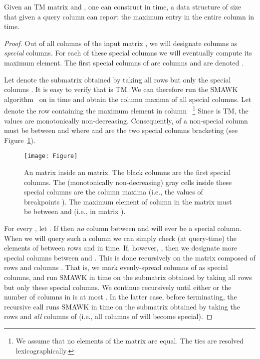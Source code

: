 \documentclass{llncs}
\begin{document}
\begin{lemma} \label{lemma:micro}
Given an  TM matrix and , one can construct in  time, a data structure of size  that given a query column can report the maximum entry in the entire column in 
 time. 
\end{lemma}
\begin{proof}
Out of all  columns of the input matrix , we will designate
 columns as {\em special} columns. For each of these special columns we will eventually compute its maximum element.  
The first  special columns of  are  columns  and are denoted . 

Let  denote the  submatrix obtained by taking all 
rows but only the  special columns . It is easy to verify that 
is TM. We can therefore run the SMAWK
algorithm~\cite{SMAWK} on  in   time and obtain the column
maxima of all special columns. 
Let  denote the row containing the maximum element in column ~\footnote{We assume that no elements of the matrix are equal. The ties are resolved lexicographically.}
Since  is TM, the  values are monotonically
non-decreasing. Consequently,  of a non-special column  must be
between  and  where  and  are
the two special  columns bracketing   
 (see Figure~\ref{fig}). 
 
\begin{figure}[h!]
   \centering
   \texttt{[image: Figure]}
   \caption{An  matrix inside an  matrix. The
     black columns are the first  special columns. The
     (monotonically  non-decreasing) gray cells inside these special
     columns are the column maxima (i.e., the  values of breakpoints ). The maximum element of column  in the  matrix must be between  and  (i.e., in matrix ).}
  \label{fig}
 \end{figure}

For every , let . If  then
{\em no} column between  and  will ever be a special
column. When we will query such a column  we can simply check
(at query-time) the  elements of  between rows  and
 in  time. If, however, , then we designate
more special columns between  and . This is done
recursively on the  matrix  composed of
rows  and columns . That is, we mark  evenly-spread columns of  as
special columns,  and run SMAWK in  time on the  submatrix    obtained by taking all  rows but only
these  special columns. We continue recursively until either  or the number of columns in  is at most . In the
latter case, before terminating, the recursive call runs SMAWK in  time on the  submatrix  obtained by taking the  rows and {\em
  all} columns of  (i.e., all columns of  will become
special). 


\end{proof}
\end{document}
